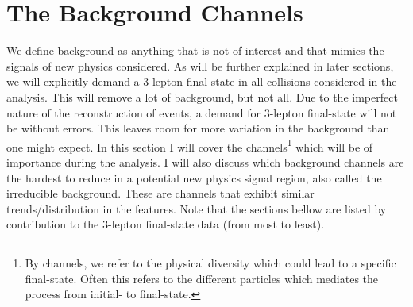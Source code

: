 \section{The Background Channels}\label{sec:bkg}
We define background as anything that is not of interest and that mimics the signals of new physics considered. 
As will be further explained in  later sections, we will explicitly demand a 3-lepton final-state in all collisions 
considered in the analysis. This will remove a lot of background, but not all. Due to the imperfect nature of the 
reconstruction of events, a demand for 3-lepton final-state will not be without errors. This leaves room for more 
variation in the background than one might expect. In this section I will cover the channels\footnote{By channels,
we refer to the physical diversity which could lead to a specific final-state. Often this refers to 
the different particles which mediates the process from initial- to final-state.} which will 
be of importance during the analysis. I will also discuss which background channels are the hardest 
to reduce in a potential new physics signal region, also called the irreducible background. These are 
channels that exhibit similar trends/distribution in the features. Note that the sections bellow
are listed by contribution to the 3-lepton final-state data (from most to least).  

